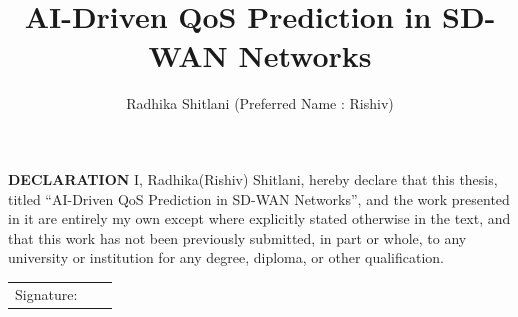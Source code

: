 \documentclass[a4paper,12pt]{Classes/RoboticsLaTeX}
\title{\Large{AI-Driven QoS Prediction in SD-WAN Networks}}
\author{Radhika Shitlani (Preferred Name : Rishiv)}
\begin{document}
		{\linespread{1}\selectfont\maketitle}

	\newpage\null\thispagestyle{empty}\newpage
	
	\setcounter{secnumdepth}{3}
	\setcounter{tocdepth}{3}
	
	\frontmatter
	
	\textbf{DECLARATION} 
	I, Radhika(Rishiv) Shitlani, hereby declare that this thesis, titled ``AI-Driven QoS Prediction in SD-WAN Networks'', and the work presented in it are entirely my own except where explicitly stated otherwise in the text, and that this work has not been previously submitted, in part or whole, to any university or institution for any degree, diploma, or other qualification. 
	\newline
	
	\begin{tabular}{@{}p{.9in}p{3.4in}@{}}
		Signature: & ~~\hrulefill \\
	\end{tabular}
	\newpage
	
	
	
\end{document}

